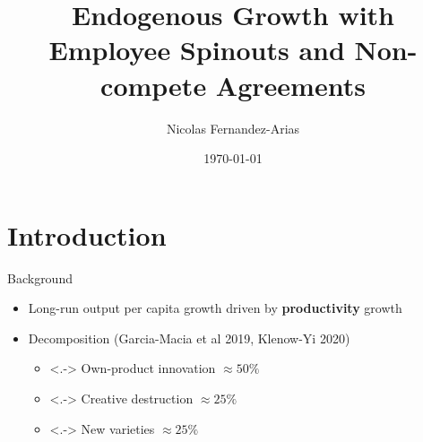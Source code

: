 \documentclass[english,usenames,dvipsnames]{beamer}
\title{Endogenous Growth with Employee Spinouts and Non-compete Agreements}
\author{Nicolas Fernandez-Arias}
\date{\today }
\begin{document}
\maketitle

\section{Introduction}


\begin{frame}{Background}\label{motivation_background}
	\begin{itemize}
		\item<+-> Long-run output per capita growth driven by \alert{\textbf{productivity}} growth \hyperlink{economic_growth_facts}{}
		\medskip
		\item<+-> Decomposition (Garcia-Macia et al 2019, Klenow-Yi 2020)
		\begin{itemize}
			\item<.-> Own-product innovation $\approx 50\%$
			\item<.-> Creative destruction $\approx 25\%$
			\item<.-> New varieties $\approx 25\%$
		\end{itemize}
	\end{itemize}
\end{frame}
\end{document}
